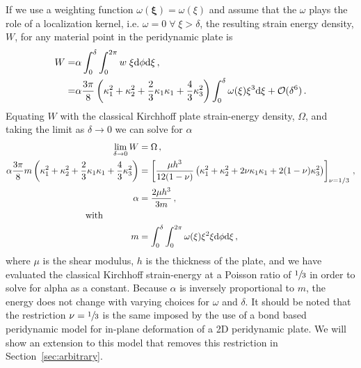 %
If we use a weighting function \(\omega(\boldsymbol{\xi})=\omega(\xi)\) and assume that the $\omega$ plays the role of a localization kernel, i.e. $\omega = 0 \; \forall \; \xi > \delta$, the resulting strain energy density, $W$, for any material point in the peridynamic plate is
%
\begin{align}
    W =& \alpha \int_{0}^\delta\int_0^{2 \pi} w\; \xi {\rm d}\phi {\rm d}\xi \, ,\notag \\
    =& \alpha \frac{3\pi}{8} \left(\kappa_1^2+\kappa_2^2+\frac{2}{3}\kappa_1\kappa_1+\frac{4}{3}\kappa_3^2 \right)\int_{0}^\delta \omega(\xi)\xi^3{\rm d}\xi + \mathcal{O}(\delta^6)\, .\notag 
\end{align}
%
Equating $W$ with the classical Kirchhoff plate strain-energy density, $\Omega$, and taking the limit as $\delta \to 0$ we can solve for $\alpha$
%
\begin{align}
    \lim_{\delta \to 0}  W &= \Omega\, , \notag \\
    \alpha \frac{3 \pi}{8} m \left(\kappa_1^2+\kappa_2^2+\frac{2}{3}\kappa_1\kappa_1+\frac{4}{3}\kappa_3^2 \right)&= \left[ \frac{\mu h^3}{12(1-\nu)} \left(\kappa_1^2+\kappa_2^2+2\nu\kappa_1\kappa_1+2(1-\nu)\kappa_3^2 \right) \right]_{\nu=1/3}\, , \notag \\
    \alpha &= \frac{2 \mu h^3}{3 m}\, , \\
    \text{with}\qquad \qquad \notag \\
    m &= \int_{0}^{\delta} \int_{0}^{2\pi}\omega(\xi) \xi^2 \xi {\rm d}\phi {\rm d}\xi \notag \, ,
\end{align}
%
where $\mu$ is the shear modulus, $h$ is the thickness of the plate, and we have evaluated the classical Kirchhoff strain-energy at a Poisson ratio of \(\sfrac{1}{3}\) in order to solve for alpha as a constant.  Because $\alpha$ is inversely proportional to $m$, the energy does not change with varying choices for $\omega$ and $\delta$. It should be noted that the restriction \(\nu=\sfrac{1}{3}\) is the same imposed by the use of a bond based peridynamic model for in-plane deformation of a 2D peridynamic plate. We will show an extension to this model that removes this restriction in Section~\ref{sec:arbitrary}.

